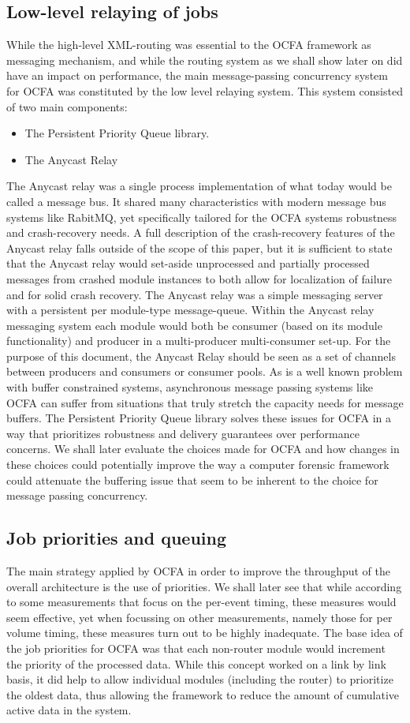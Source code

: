 \subsection{Low-level relaying of jobs}
While the high-level XML-routing was essential to the OCFA framework as messaging mechanism, and while the routing system as we shall show later on did have an impact on performance, the main message-passing concurrency system for OCFA was constituted by the low level relaying system. This system consisted of two main components:
\begin{itemize}
\item The Persistent Priority Queue library.
\item The Anycast Relay
\end{itemize}
The Anycast relay was a single process implementation of what today would be called a message bus. It shared many characteristics with modern message bus systems like RabitMQ, yet specifically tailored for the OCFA systems robustness and crash-recovery needs. A full description of the crash-recovery features of the Anycast relay falls outside of the scope of this paper, but it is sufficient to state that the Anycast relay would set-aside unprocessed and partially processed messages from crashed module instances to both allow for localization of failure and for solid crash recovery. The Anycast relay was a simple messaging server with a persistent per module-type message-queue. Within the 
Anycast relay messaging system each module would both be consumer (based on its module functionality) and producer in a multi-producer multi-consumer set-up. 
For the purpose of this document, the Anycast Relay should be seen as a set of channels between producers and consumers or consumer pools. As is a well known problem with buffer constrained systems, asynchronous message passing systems like OCFA can suffer from situations that truly stretch the capacity needs for message buffers. The Persistent Priority Queue library solves these issues for OCFA in a way that prioritizes robustness and delivery guarantees over performance concerns. We shall later evaluate the choices made for OCFA and how changes in these choices could potentially improve the way a computer forensic framework could attenuate the buffering issue that seem to be inherent to the choice for message passing concurrency. 
\subsection{Job priorities and queuing}
The main strategy applied by OCFA in order to improve the throughput of the overall architecture is the use of priorities. We shall later see that while according to some measurements that focus on the per-event timing, these measures would seem effective, yet when focussing on other measurements, namely those for per volume timing, these measures turn out to be highly inadequate. The base idea of the job priorities for OCFA was that each non-router module would increment the priority of the processed data. While this concept worked on a link by link basis, it did help to allow individual modules (including the router) to prioritize the oldest data, thus allowing the framework to reduce the amount of cumulative active data in the system. 
